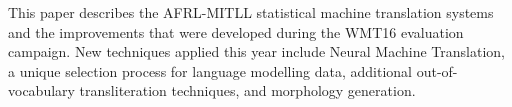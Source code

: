 This paper describes the AFRL-MITLL statistical machine translation systems and the improvements that were developed during the WMT16 evaluation campaign. New techniques applied this year include Neural Machine Translation, a unique selection process for language modelling data, additional out-of-vocabulary transliteration techniques, and morphology generation.
